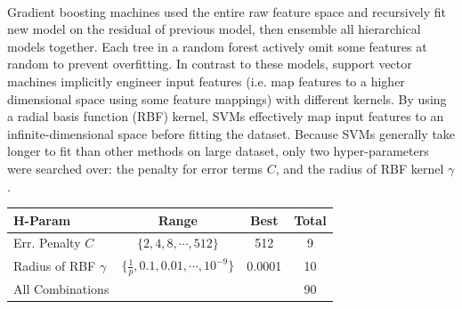 \documentclass[11pt]{article}
\begin{document}
 	\paragraph{} Gradient boosting machines used the entire raw feature space and recursively fit new model on the residual of previous model, then ensemble all hierarchical models together. Each tree in a random forest actively omit some features at random to prevent overfitting. In contrast to these models, support vector machines implicitly engineer input features (i.e. map features to a higher dimensional space using some feature mappings) with different kernels. By using a radial basis function (RBF) kernel, SVMs effectively map input features to an infinite-dimensional space before fitting the dataset. Because SVMs generally take longer to fit than other methods on large dataset, only two hyper-parameters were searched over: the penalty for error terms $C$, and the radius of RBF kernel $\gamma$.
 	\begin{table}[H]
 		\centering
 		\begin{tabular}{l|c|c|c}
 		H-Param & Range & Best & Total \\
 		\hline
 		Err. Penalty $C$ & $\{2, 4, 8, \cdots, 512\}$ & 512 & 9 \\
 		Radius of RBF $\gamma$ & $\{\frac{1}{p}, 0.1, 0.01, \cdots, 10^{-9}\}$ & 0.0001 & 10 \\
 		\hline
 		All Combinations & & & 90
 		\end{tabular}
 	\end{table}

% 	
% 	
\end{document}
